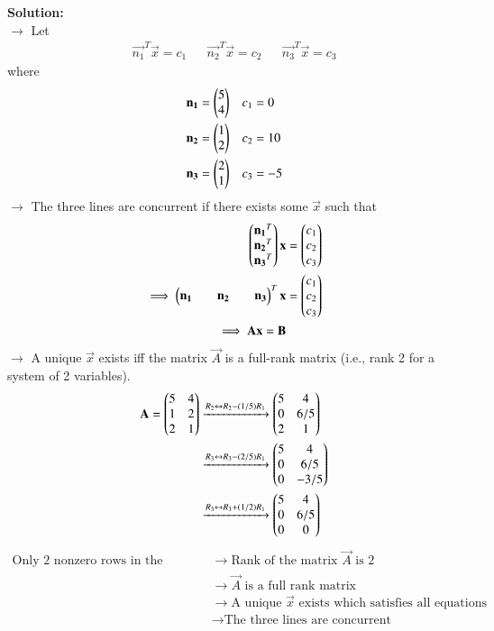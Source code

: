 \documentclass[journal]{IEEEtran}
\begin{document}
\textbf{Solution:}\\
$\rightarrow$ Let
\begin{align*}
    \vec{n_1}^T\vec{x} = c_1 && \vec{n_2}^T\vec{x} = c_2 && \vec{n_3}^T\vec{x} = c_3
\end{align*}
\hspace{0.3cm} where
\begin{align}
    \mathbf{n_1} = \begin{pmatrix}5\\4\end{pmatrix} && c_1 &= 0 \\
    \mathbf{n_2} = \begin{pmatrix}1\\2\end{pmatrix} && c_2 &= 10 \\
    \mathbf{n_3} = \begin{pmatrix}2\\1\end{pmatrix} && c_3 &= -5
\end{align}
$\rightarrow$ The three lines are concurrent if there exists some $\vec{x}$ such that
\begin{align}
    \begin{pmatrix}\mathbf{n_1}^T\\\mathbf{n_2}^T\\\mathbf{n_3}^T\end{pmatrix} \mathbf{x} &= \begin{pmatrix}c_1\\c_2\\c_3\end{pmatrix} \\
    \implies \begin{pmatrix}\mathbf{n_1}&&\mathbf{n_2}&&\mathbf{n_3}\end{pmatrix}^{T} \mathbf{x} &= \begin{pmatrix}c_1\\c_2\\c_3\end{pmatrix} \\
    \implies \mathbf{A}\mathbf{x} = \mathbf{B}
\end{align}
$\rightarrow$ A unique $\vec{x}$ exists iff the matrix $\vec{A}$ is a full-rank matrix (i.e., rank 2 for a system of 2 variables).
\begin{align}
    \mathbf{A} = \begin{pmatrix}5&4\\1&2\\2&1\end{pmatrix}
    &\xrightarrow{R_2 \leftrightarrow R_2 - (1/5)R_1} \begin{pmatrix}5&4\\0&6/5\\2&1\end{pmatrix}\\
    &\xrightarrow{R_3 \leftrightarrow R_3 - (2/5)R_1} \begin{pmatrix}5&4\\0&6/5\\0&-3/5\end{pmatrix}\\
    &\xrightarrow{R_3 \leftrightarrow R_3 + (1/2)R_1} \begin{pmatrix}5&4\\0&6/5\\0&0\end{pmatrix}
\end{align}
\begin{align*}
    \text{Only 2 nonzero rows in the matrix in (9)}
    &\longrightarrow \text{Rank of the matrix $\vec{A}$ is 2} \\
    &\longrightarrow \text{$\vec{A}$ is a full rank matrix} \\
    &\longrightarrow \text{A unique $\vec{x}$ exists which satisfies all equations} \\
    &\longrightarrow \text{The three lines are concurrent}
\end{align*}
\end{document}
